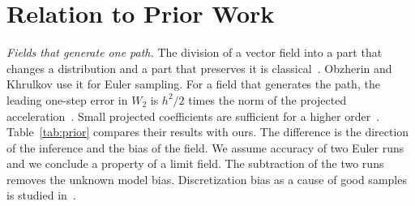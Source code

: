 \section{Relation to Prior Work}
\label{sec:related}
\emph{Fields that generate one path.} The division of a vector field
into a part that changes a distribution and a part that preserves it is
classical~\citep{ambrosio2005gradient,horvat2024gauge}. Obzherin and
Khrulkov use it for Euler sampling. For a field that generates the
path, the leading one-step error in $W_2$ is $h^2/2$ times the norm of
the projected acceleration~\citep[Theorem~2]{obzherin2026density}.
Small projected coefficients are sufficient for a higher
order~\citep[Corollary~8]{obzherin2026finite}. Table~\ref{tab:prior}
compares their results with ours. The difference is the direction of
the inference and the bias of the field. We assume accuracy of two
Euler runs and we conclude a property of a limit field. The subtraction
of the two runs removes the unknown model bias. Discretization bias as
a cause of good samples is studied
in~\citep{zhou2026discretization}.\AIassistance

